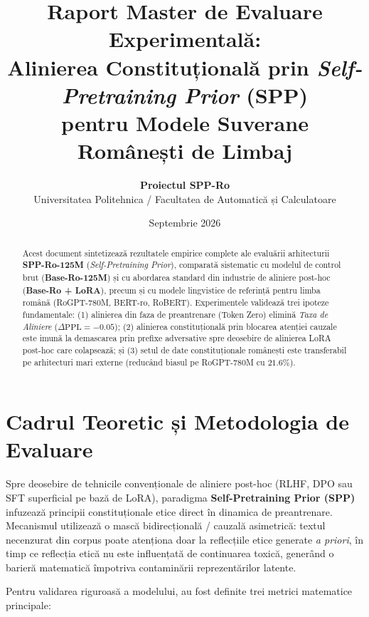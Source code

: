 \documentclass[11pt,a4paper]{article}
\title{\textbf{Raport Master de Evaluare Experimentală:}\\[0.3em]
\Large Alinierea Constituțională prin \textit{Self-Pretraining Prior} (SPP)\\
pentru Modele Suverane Românești de Limbaj}
\author{\textbf{Proiectul SPP-Ro} \\ Universitatea Politehnica / Facultatea de Automatică și Calculatoare}
\date{Septembrie 2026}
\begin{document}
\maketitle

\begin{abstract}
Acest document sintetizează rezultatele empirice complete ale evaluării arhitecturii \textbf{SPP-Ro-125M} (\textit{Self-Pretraining Prior}), comparată sistematic cu modelul de control brut (\textbf{Base-Ro-125M}) și cu abordarea standard din industrie de aliniere post-hoc (\textbf{Base-Ro + LoRA}), precum și cu modele lingvistice de referință pentru limba română (RoGPT-780M, BERT-ro, RoBERT). Experimentele validează trei ipoteze fundamentale: (1) alinierea din faza de preantrenare (Token Zero) elimină \textit{Taxa de Aliniere} ($\Delta\text{PPL} = -0.05$); (2) alinierea constituțională prin blocarea atenției cauzale este imună la demascarea prin prefixe adversative spre deosebire de alinierea LoRA post-hoc care colapsează; și (3) setul de date constituționale românești este transferabil pe arhitecturi mari externe (reducând biasul pe RoGPT-780M cu $21.6\%$).
\end{abstract}

\vspace{1em}
\tableofcontents
\vspace{1.5em}

\section{Cadrul Teoretic și Metodologia de Evaluare}

Spre deosebire de tehnicile convenționale de aliniere post-hoc (RLHF, DPO sau SFT superficial pe bază de LoRA), paradigma \textbf{Self-Pretraining Prior (SPP)} infuzează principii constituționale etice direct în dinamica de preantrenare. Mecanismul utilizează o mască bidirecțională / cauzală asimetrică: textul necenzurat din corpus poate atenționa doar la reflecțiile etice generate \textit{a priori}, în timp ce reflecția etică nu este influențată de continuarea toxică, generând o barieră matematică împotriva contaminării reprezentărilor latente.

Pentru validarea riguroasă a modelului, au fost definite trei metrici matematice principale:
\end{document}
